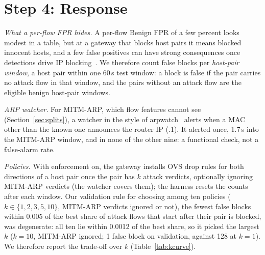 \section{Step 4: Response}\label{sec:response}

\emph{What a per-flow FPR hides.} A per-flow Benign FPR of a few percent looks modest in a table, but at a gateway that blocks host pairs it means blocked innocent hosts, and a few false positives can have strong consequences once detections drive IP blocking~\cite{garcia2023labeling,akbari2020atmos}. We therefore count false blocks per \emph{host-pair window}, a host pair within one 60\,s test window: a block is false if the pair carries no attack flow in that window, and the pairs without an attack flow are the eligible benign host-pair windows.

\emph{ARP watcher.} For MITM-ARP, which flow features cannot see (Section~\ref{sec:splits}), a watcher in the style of arpwatch~\cite{arpwatch} alerts when a MAC other than the known one announces the router IP (.1). It alerted once, 1.7\,s into the MITM-ARP window, and in none of the other nine: a functional check, not a false-alarm rate.

\emph{Policies.} With enforcement on, the gateway installs OVS drop rules for both directions of a host pair once the pair has $k$ attack verdicts, optionally ignoring MITM-ARP verdicts (the watcher covers them); the harness resets the counts after each window. Our validation rule for choosing among ten policies ($k\in\{1,2,3,5,10\}$, MITM-ARP verdicts ignored or not), the fewest false blocks within 0.005 of the best share of attack flows that start after their pair is blocked, was degenerate: all ten lie within 0.0012 of the best share, so it picked the largest $k$ ($k=10$, MITM-ARP ignored; 1 false block on validation, against 128 at $k=1$). We therefore report the trade-off over $k$ (Table~\ref{tab:kcurve}).

